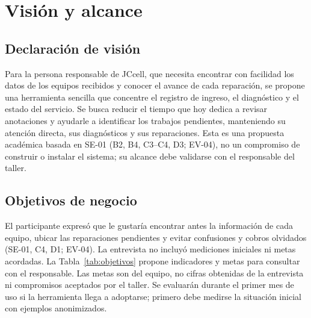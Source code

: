 \section{Visi\'on y alcance}\label{sec:vision}

\subsection{Declaraci\'on de visi\'on}
Para la persona responsable de JC\textbar{}cell, que necesita encontrar con facilidad los datos
de los equipos recibidos y conocer el avance de cada reparaci\'on, se propone una herramienta
sencilla que concentre el registro de ingreso, el diagn\'ostico y el estado del servicio. Se busca
reducir el tiempo que hoy dedica a revisar anotaciones y ayudarle a identificar los trabajos
pendientes, manteniendo su atenci\'on directa, sus diagn\'osticos y sus reparaciones. Esta es una
propuesta acad\'emica basada en SE-01 (B2, B4, C3--C4, D3; EV-04), no un compromiso de construir o
instalar el sistema; su alcance debe validarse con el responsable del taller.

\subsection{Objetivos de negocio}
El participante expres\'o que le gustar\'ia encontrar antes la informaci\'on de cada equipo, ubicar
las reparaciones pendientes y evitar confusiones y cobros olvidados (SE-01, C4, D1; EV-04).
La entrevista no incluyó mediciones iniciales ni metas acordadas. La
Tabla~\ref{tab:objetivos} propone indicadores y metas para consultar con el responsable.
Las metas son del equipo, no cifras obtenidas de la entrevista ni compromisos aceptados por el
taller. Se evaluarán durante el primer mes de uso si la herramienta llega a adoptarse; primero
debe medirse la situación inicial con ejemplos anonimizados.

